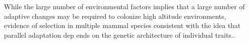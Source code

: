 
While the large number of environmental factors implies that a large number of adaptive changes may be required to colonize     high altitude environments, evidence of selection in multiple mammal species consistent with the idea that parallel adaptation dep    ends on the genetic architecture of individual traits.\cite[]{Yi_2010_20595611,Simonson_2010_20466884,Storz_2007_17397259,Qiu_2012_    22751099}.